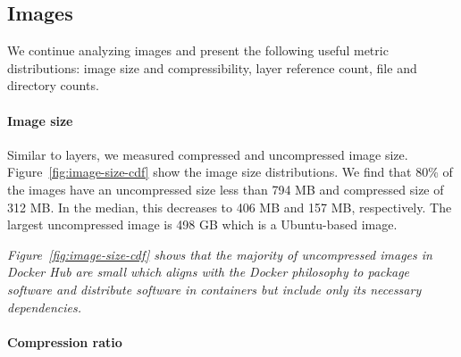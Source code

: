 \subsection{Images}
\label{sec:images}

We continue analyzing images and present the following useful metric distributions: image size and compressibility, layer reference count, file and directory
counts. 

\paragraph{Image size}%

%

Similar to layers, we measured compressed and uncompressed image size. 
Figure~\ref{fig:image-size-cdf} show the image size distributions. 
We find that 80\% of the images have an uncompressed size less than
794 MB and compressed size of 312 MB.
In the median, this decreases to 406 MB and 157 MB, respectively. The largest
uncompressed image is 498 GB which is a Ubuntu-based image.  

\emph{Figure~\ref{fig:image-size-cdf} shows that the majority of uncompressed images in
Docker Hub are small which aligns with the Docker philosophy to package
software and distribute software in containers but include only its necessary
dependencies.}

\paragraph{Compression ratio}


